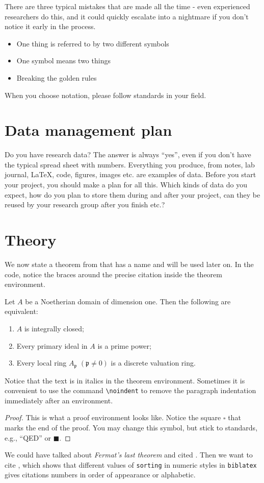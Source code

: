 There are three typical mistakes that are made all the time - even experienced researchers do this, and it could quickly escalate into a nightmare if you don't notice it early in the process.
  \begin{itemize}
      \item One thing is referred to by two different symbols
        \item One symbol means two things
    \item Breaking the golden rules
  \end{itemize}

When you choose notation, please follow standards in your field.









\section{Data management plan}
Do you have research data? The answer is always \enquote{yes}, even if you don't have the typical spread sheet with numbers. Everything you produce, from notes, lab journal, \LaTeX, code, figures, images etc. are examples of data. Before you start your project, you should make a plan for all this. Which kinds of data do you expect, how do you plan to store them during and after your project, can they be reused by your research group after you finish etc.?  

\section{Theory}
We now state a theorem from {\cite{AM69}} that has a name and will be used later on. In the code, notice the braces around the precise citation inside the theorem environment.
\begin{theorem}
    \label{thm:dedekind}
    Let \( A \) be a Noetherian domain of dimension one. Then the following are equivalent:
    \begin{enumerate}[leftmargin=30pt] %
        \item \( A \) is integrally closed;
        \item Every primary ideal in \( A \) is a prime power;
        \item Every local ring \( A_\mathfrak{p} \) \( (\mathfrak{p} \neq 0) \) is a discrete valuation ring.
    \end{enumerate}
\end{theorem}
\noindent Notice that the text is in italics in the theorem environment. Sometimes it is convenient to use the command \texttt{\textbackslash noindent} to remove the paragraph indentation immediately after an environment.
\begin{proof}
This is what a proof environment looks like. Notice the square $\square$ that marks the end of the proof. You may change this symbol, but stick to standards, e.g., \enquote{QED} or $\blacksquare$.
\end{proof}

We could have talked about \emph{Fermat's last theorem} and cited \cite[Theorem~1.1]{Wil93}. Then we want to cite \cite{Vie08}, which shows that different values of \texttt{sorting} in numeric styles in \texttt{biblatex} gives citations numbers in order of appearance or alphabetic.


